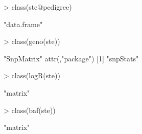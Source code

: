 \documentclass[10pt]{article}
\begin{document}
\begin{Schunk}
\begin{Sinput}
> class(ste@pedigree)
\end{Sinput}
\begin{Soutput}
[1] "data.frame"
\end{Soutput}
\begin{Sinput}
> class(geno(ste))
\end{Sinput}
\begin{Soutput}
[1] "SnpMatrix"
attr(,"package")
[1] "snpStats"
\end{Soutput}
\begin{Sinput}
> class(logR(ste))
\end{Sinput}
\begin{Soutput}
[1] "matrix"
\end{Soutput}
\begin{Sinput}
> class(baf(ste))
\end{Sinput}
\begin{Soutput}
[1] "matrix"
\end{Soutput}
\end{Schunk}
\end{document}
